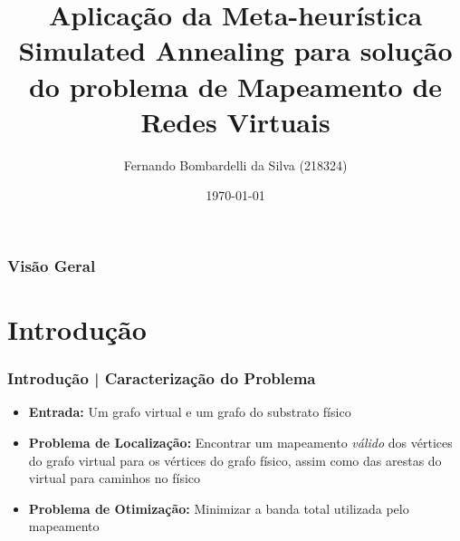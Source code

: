 \documentclass{beamer}
\title[Simulated Annealing + Redes Virtuais]{Aplicação da Meta-heurística Simulated Annealing para solução do problema de Mapeamento de Redes Virtuais} %
\author[Fernando]{Fernando Bombardelli da Silva (218324)} %
\institute[UFRGS] %
{
Universidade Federal do Rio Grande do Sul \\ %
Instituto de Informática \\
\medskip
\textit{fbdasilva@inf.ufrgs.br} %
}
\date{\today} %
\begin{document}
\begin{frame}
\titlepage %
\end{frame}

\begin{frame}
\frametitle{Visão Geral} %
\tableofcontents %
\end{frame}


\section{Introdução} %


\begin{frame}
\frametitle{Introdução | Caracterização do Problema}
\begin{itemize}
\item \textbf{Entrada:} Um grafo virtual e um grafo do substrato físico
\item \textbf{Problema de Localização:} Encontrar um mapeamento \emph{válido} dos vértices do grafo virtual para os vértices do grafo físico, assim como das arestas do virtual para caminhos no físico
\item \textbf{Problema de Otimização:} Minimizar a banda total utilizada pelo mapeamento
\end{itemize}
\end{frame}
\end{document}
